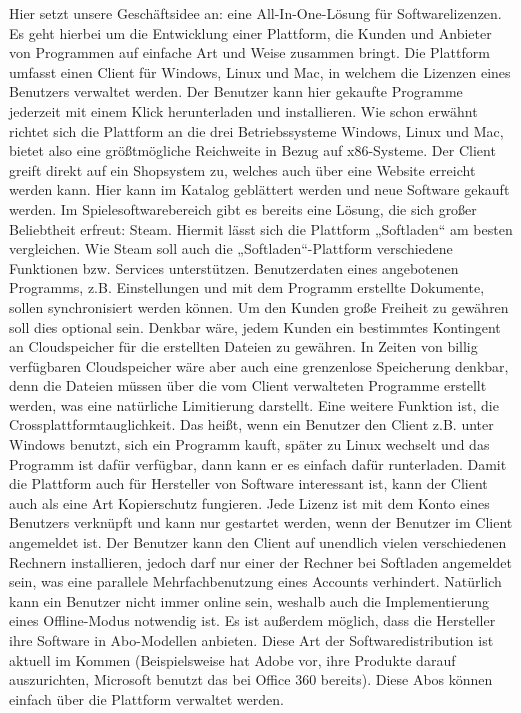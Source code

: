 Hier setzt unsere Geschäftsidee an: eine All-In-One-Lösung für Softwarelizenzen. Es geht hierbei um die Entwicklung einer Plattform, die Kunden und Anbieter von Programmen auf einfache Art und Weise zusammen bringt. Die Plattform umfasst einen Client für Windows, Linux und Mac, in welchem die Lizenzen eines Benutzers verwaltet werden. Der Benutzer kann hier gekaufte Programme jederzeit mit einem Klick herunterladen und installieren. Wie schon erwähnt richtet sich die Plattform an die drei Betriebssysteme Windows, Linux und Mac, bietet also eine größtmögliche Reichweite in Bezug auf x86-Systeme. Der Client greift direkt auf ein Shopsystem zu, welches auch über eine Website erreicht werden kann. Hier kann im Katalog geblättert werden und neue Software gekauft werden. Im Spielesoftwarebereich gibt es bereits eine Lösung, die sich großer Beliebtheit erfreut: Steam. Hiermit lässt sich die Plattform „Softladen“ am besten vergleichen. Wie Steam soll auch die „Softladen“-Plattform verschiedene Funktionen bzw. Services unterstützen. Benutzerdaten eines angebotenen Programms, z.B. Einstellungen und mit dem Programm erstellte Dokumente, sollen synchronisiert werden können. Um den Kunden große Freiheit zu gewähren soll dies optional sein. Denkbar wäre, jedem Kunden ein bestimmtes Kontingent an Cloudspeicher für die erstellten Dateien zu gewähren. In Zeiten von billig verfügbaren Cloudspeicher wäre aber auch eine grenzenlose Speicherung denkbar, denn die Dateien müssen über die vom Client verwalteten Programme erstellt werden, was eine natürliche Limitierung darstellt. 
Eine weitere Funktion ist, die Crossplattformtauglichkeit. Das heißt, wenn ein Benutzer den Client z.B. unter Windows benutzt, sich ein Programm kauft, später zu Linux wechselt und das Programm ist dafür verfügbar, dann kann er es einfach dafür runterladen.
Damit die Plattform auch für Hersteller von Software interessant ist, kann der Client auch als eine Art Kopierschutz fungieren. Jede Lizenz ist mit dem Konto eines Benutzers verknüpft und kann nur gestartet werden, wenn der Benutzer im Client angemeldet ist. Der Benutzer kann den Client auf unendlich vielen verschiedenen Rechnern installieren, jedoch darf nur einer der Rechner bei Softladen angemeldet sein, was eine parallele Mehrfachbenutzung eines Accounts verhindert. Natürlich kann ein Benutzer nicht immer online sein, weshalb auch die Implementierung eines Offline-Modus notwendig ist. Es ist außerdem möglich, dass die Hersteller ihre Software in Abo-Modellen anbieten. Diese Art der Softwaredistribution ist aktuell im Kommen (Beispielsweise hat Adobe vor, ihre Produkte darauf auszurichten, Microsoft benutzt das bei Office 360 bereits). Diese Abos können einfach über die Plattform verwaltet werden.
